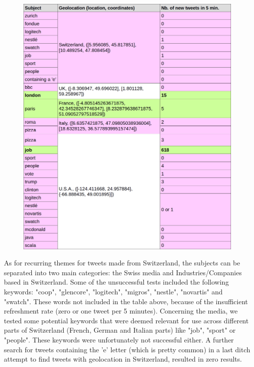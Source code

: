 \documentclass[a4paper,11pt]{report}
\begin{document}
\begin{figure}[H]
\begin{center}
\includegraphics[width=\textwidth]{figures/subjects-list.png}
\end{center}
\end{figure}

\newpage

As for recurring themes for tweets made from Switzerland, the subjects can be separated into two main categories: the Swiss media and Industries/Companies based in Switzerland. Some of the unsuccessful tests included the following keywords: "coop", "glencore", "logitech", "migros", "nestle", "novartis" and "swatch". These words not included in the table above, because of the insufficient refreshment rate (zero or one tweet per 5 minutes).
Concerning the media, we tested some potential keywords that were deemed relevant for use across different parts of Switzerland (French, German and Italian parts) like "job", "sport" or "people". These keywords were unfortunately not successful either. A further search for tweets containing the 'e' letter (which is pretty common) in a last ditch attempt to find tweets with geolocation in Switzerland, resulted in zero results.\\
\end{document}
